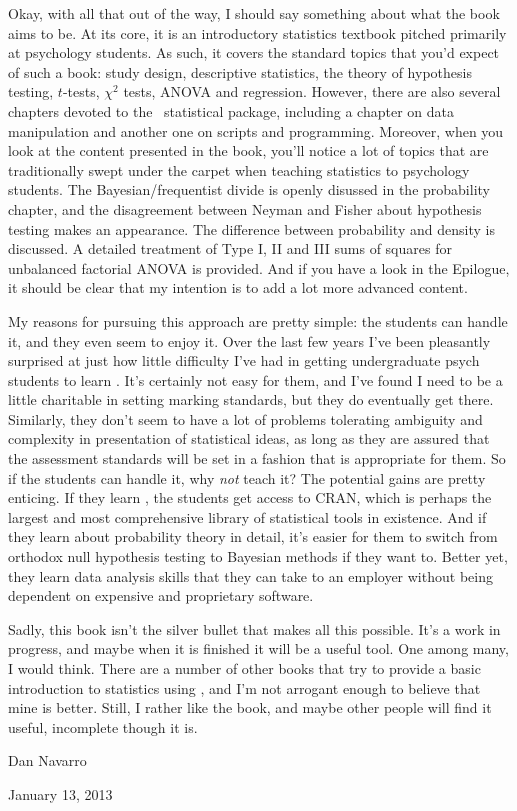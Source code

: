 Okay, with all that out of the way, I should say something about what the book aims to be. At its core, it is an introductory statistics textbook pitched primarily at psychology students. As such, it covers the standard topics that you'd expect of such a book: study design, descriptive statistics, the theory of hypothesis testing, $t$-tests, $\chi^2$ tests, ANOVA and regression. However, there are also several chapters devoted to the \R\ statistical package, including a chapter on data manipulation and another one on scripts and programming. Moreover, when you look at the content presented in the book, you'll notice a lot of topics that are traditionally swept under the carpet when teaching statistics to psychology students. The Bayesian/frequentist divide is openly disussed in the probability chapter, and the disagreement between Neyman and Fisher about hypothesis testing makes an appearance. The difference between probability and density is discussed. A detailed treatment of Type I, II and III sums of squares for unbalanced factorial ANOVA is provided. And if you have a look in the Epilogue, it should be clear that my intention is to add a lot more advanced content.\vsp

My reasons for pursuing this approach are pretty simple: the students can handle it, and they even seem to enjoy it. Over the last few years I've been pleasantly surprised at just how little difficulty I've had in getting undergraduate psych students to learn \R. It's certainly not easy for them, and I've found I need to be a little charitable in setting marking standards, but they do eventually get there. Similarly, they don't seem to have a lot of problems tolerating ambiguity and complexity in presentation of statistical ideas, 
as long as they are assured that the assessment standards will be set in a fashion that is appropriate for them.  So if the students can handle it, why {\it not} teach it? The potential gains are pretty enticing. If they learn \R, the students get access to CRAN, which is perhaps the largest and most comprehensive library of statistical tools in existence. And if they learn about probability theory in detail, it's easier for them to switch from orthodox null hypothesis testing to Bayesian methods if they want to. Better yet, they learn data analysis skills that they can take to an employer without being dependent on expensive and proprietary software. \vsp

Sadly, this book isn't the silver bullet that makes all this possible. It's a work in progress, and maybe when it is finished it will be a useful tool. One among many, I would think. There are a number of other books that try to provide a basic introduction to statistics using \R, and I'm not arrogant enough to believe that mine is better. Still, I rather like the book, and maybe other people will find it useful, incomplete though it is.

\vspace*{24pt}
\noindent
Dan Navarro 

\noindent
January 13, 2013
\clearpage 











